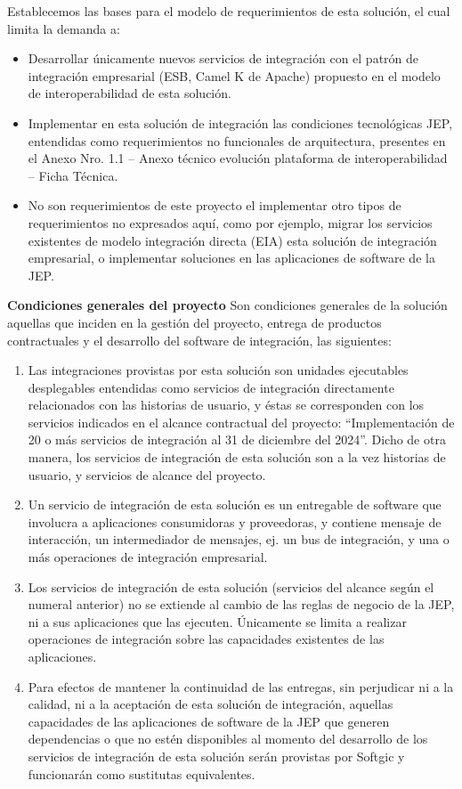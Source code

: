 \documentclass[
  paper=a4,
  ,captions=tableheading
]{scrartcl}
\providecommand{\tightlist}{%
  \setlength{\itemsep}{0pt}\setlength{\parskip}{0pt}}
\begin{document}
Establecemos las bases para el modelo de requerimientos de esta
solución, el cual limita la demanda a:

\begin{itemize}
\tightlist
\item
  Desarrollar únicamente nuevos servicios de integración con el patrón
  de integración empresarial (ESB, Camel K de Apache) propuesto en el
  modelo de interoperabilidad de esta solución.
\item
  Implementar en esta solución de integración las condiciones
  tecnológicas JEP, entendidas como requerimientos no funcionales de
  arquitectura, presentes en el Anexo Nro. 1.1 -- Anexo técnico
  evolución plataforma de interoperabilidad -- Ficha Técnica.
\item
  No son requerimientos de este proyecto el implementar otro tipos de
  requerimientos no expresados aquí, como por ejemplo, migrar los
  servicios existentes de modelo integración directa (EIA) esta solución
  de integración empresarial, o implementar soluciones en las
  aplicaciones de software de la JEP.
\end{itemize}

\textbf{Condiciones generales del proyecto} Son condiciones generales de
la solución aquellas que inciden en la gestión del proyecto, entrega de
productos contractuales y el desarrollo del software de integración, las
siguientes:

\begin{enumerate}
\def\labelenumi{\arabic{enumi}.}
\tightlist
\item
  Las integraciones provistas por esta solución son unidades ejecutables
  desplegables entendidas como servicios de integración directamente
  relacionados con las historias de usuario, y éstas se corresponden con
  los servicios indicados en el alcance contractual del proyecto:
  ``Implementación de 20 o más servicios de integración al 31 de
  diciembre del 2024''. Dicho de otra manera, los servicios de
  integración de esta solución son a la vez historias de usuario, y
  servicios de alcance del proyecto.
\item
  Un servicio de integración de esta solución es un entregable de
  software que involucra a aplicaciones consumidoras y proveedoras, y
  contiene mensaje de interacción, un intermediador de mensajes, ej. un
  bus de integración, y una o más operaciones de integración
  empresarial.
\item
  Los servicios de integración de esta solución (servicios del alcance
  según el numeral anterior) no se extiende al cambio de las reglas de
  negocio de la JEP, ni a sus aplicaciones que las ejecuten. Únicamente
  se limita a realizar operaciones de integración sobre las capacidades
  existentes de las aplicaciones.
\item
  Para efectos de mantener la continuidad de las entregas, sin
  perjudicar ni a la calidad, ni a la aceptación de esta solución de
  integración, aquellas capacidades de las aplicaciones de software de
  la JEP que generen dependencias o que no estén disponibles al momento
  del desarrollo de los servicios de integración de esta solución serán
  provistas por Softgic y funcionarán como sustitutas equivalentes.
\end{enumerate}
\end{document}

